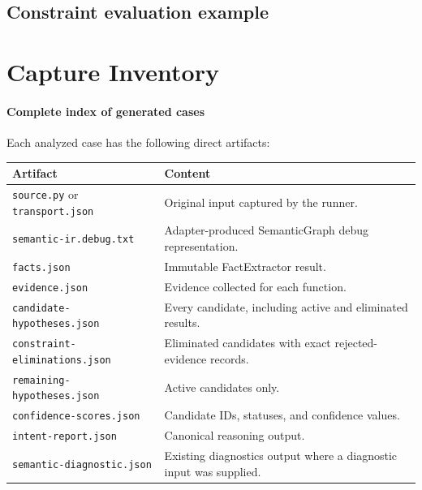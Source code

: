 \documentclass[10pt,a4paper]{article}
\newcommand{\artifact}[2]{\paragraph{#1}}
\begin{document}
\subsection{Constraint evaluation example}
\begin{center}
\end{center}

\section{Capture Inventory}

\artifact{Complete index of generated cases}{../gallery/index.json}

Each analyzed case has the following direct artifacts:
\begin{center}
\begin{tabular}{@{}p{38mm}p{104mm}@{}}
\toprule
Artifact & Content \\
\midrule
\texttt{source.py} or \texttt{transport.json} & Original input captured by the runner. \\
\texttt{semantic-ir.debug.txt} & Adapter-produced SemanticGraph debug representation. \\
\texttt{facts.json} & Immutable FactExtractor result. \\
\texttt{evidence.json} & Evidence collected for each function. \\
\texttt{candidate-hypotheses.json} & Every candidate, including active and eliminated results. \\
\texttt{constraint-eliminations.json} & Eliminated candidates with exact rejected-evidence records. \\
\texttt{remaining-hypotheses.json} & Active candidates only. \\
\texttt{confidence-scores.json} & Candidate IDs, statuses, and confidence values. \\
\texttt{intent-report.json} & Canonical reasoning output. \\
\texttt{semantic-diagnostic.json} & Existing diagnostics output where a diagnostic input was supplied. \\
\bottomrule
\end{tabular}
\end{center}
\end{document}

